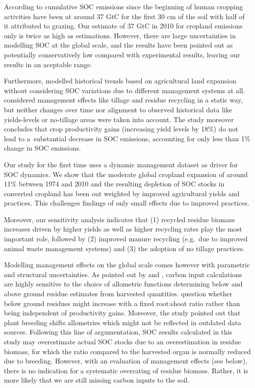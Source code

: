 \documentclass[gc, manuscript]{copernicus}
\begin{document}
According to \citep{sanderman_soil_2017} cumulative SOC emissions since the beginning of human cropping activities have been at around 37 GtC for the first 30 cm of the soil with half of it attributed to grazing. Our estimate of 37 GtC in 2010 for cropland emissions only is twice as high as \citep{sanderman_soil_2017} estimations. However, there are large uncertainties in modelling SOC at the global scale, and the \citep{sanderman_soil_2017} results have been pointed out as potentially conservatively low compared with experimental results, leaving our results in an aceptable range.

Furthermore, \citep{sanderman_soil_2017} modelled historical trends based on agricultural land expansion without considering SOC variations due to different management systems at all. \citep{pugh_simulated_2015} considered management effects like tillage and residue recycling in a static way, but neither changes over time nor alignment to observed historical data like yields-levels or no-tillage areas were taken into account. The study moreover concludes that crop productivity gains (increasing yield levels by 18\%) do not lead to a~substantial decrease in SOC emissions, accounting for only less than 1\% change in SOC emissions.

Our study for the first time uses a dynamic management dataset as driver for SOC dynamics. We show that the moderate global cropland expansion of around 11\% between 1974 and 2010 and the resulting depletion of SOC stocks in converted cropland has been out weighted by improved agricultural yields and practices. This challenges \citep{pugh_simulated_2015} findings of only small effects due to improved practices.

Moreover, our sensitivity analysis indicates that (1) recycled residue biomass increases driven by higher yields as well as higher recycling rates play the most important role, followed by (2) improved manure recycling (e.g.~due to improved animal waste management systems) and (3) the adoption of no tillage practices.

Modelling management effects on the global scale comes however with parametric and structural uncertainties. As pointed out by \citep{keel_large_2017} and \citep{smith_how_2020}, carbon input calculations are highly sensitive to the choice of allometric functions determining below and above ground residue estimates from harvested quantities. \citep{keel_large_2017} question whether below ground residues might increase with a fixed root:shoot ratio rather than being independent of productivity gains. Moreover, the study pointed out that plant breeding shifts allometries which might not be reflected in outdated data sources. Following this line of argumentation, SOC results calculated in this study may overestimate actual SOC stocks due to an overestimation in residue biomass, for which the ratio compared to the harvested organ is normally reduced due to breeding. However, with an evaluation of management effects (see below), there is no indication for a systematic overrating of residue biomass. Rather, it is more likely that we are still missing carbon inputs to the soil.
\end{document}
